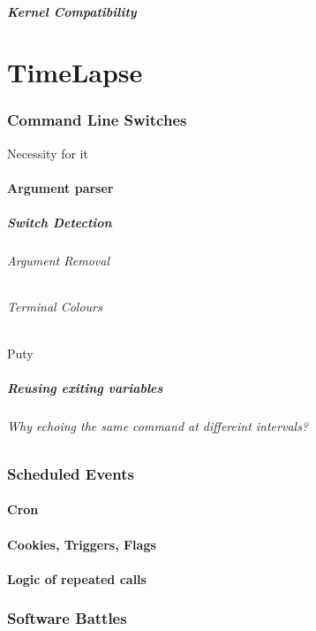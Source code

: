 \documentclass[11pt]{article} %
\begin{document}
\subsubsection{Kernel Compatibility}


\part{TimeLapse}
\section{Command Line Switches}{Necessity for it}
\subsection{Argument parser}
\subsubsection{Switch Detection}
\paragraph{Argument Removal}
\paragraph{Terminal Colours}{Puty}
\subsubsection{Reusing exiting variables}
\paragraph{Why echoing the same command at differeint intervals?}
\section{Scheduled Events}
\subsection{Cron}
\subsection{Cookies, Triggers, Flags}
\subsection{Logic of repeated calls}
\section{Software Battles}
\end{document}
